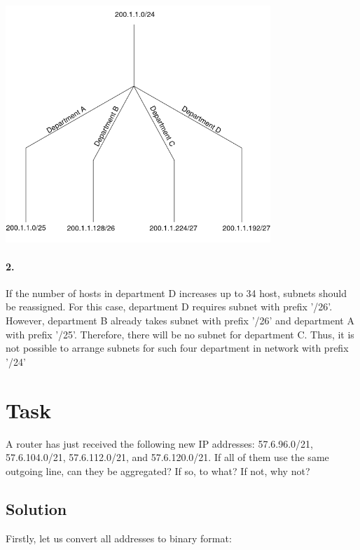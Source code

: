 \documentclass[11pt]{article}
\begin{document}
    \begin{center}
        \includegraphics[width=0.75\textwidth]{figs/Sol6-1}
    \end{center}

    \paragraph{2.}
    If the number of hosts in department D increases up to 34 host, subnets should be reassigned.
    For this case, department D requires subnet with prefix '/26'.
    However, department B already takes subnet with prefix '/26' and department A with prefix '/25'.
    Therefore, there will be no subnet for department C.
    Thus, it is not possible to arrange subnets for such four department in network with prefix '/24'

    \newpage


    \section{Task}
    A router has just received the following new IP addresses: 57.6.96.0/21, 57.6.104.0/21, 57.6.112.0/21,
    and 57.6.120.0/21.
    If all of them use the same outgoing line, can they be aggregated?
    If so, to what?
    If not, why not?

    \subsection{Solution}
    Firstly, let us convert all addresses to binary format:
\end{document}
